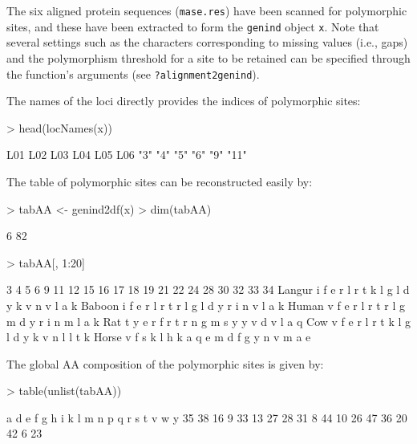 \documentclass{article}
\begin{document}
The six aligned protein sequences (\texttt{mase.res}) have been scanned for polymorphic sites, and
these have been extracted to form the \texttt{genind} object \texttt{x}.
Note that several settings such as the characters corresponding to missing values (i.e., gaps) and
the polymorphism threshold for a site to be retained can be specified through the function's
arguments (see \texttt{?alignment2genind}).

The names of the loci directly provides the indices of polymorphic sites:
\begin{Schunk}
\begin{Sinput}
> head(locNames(x))
\end{Sinput}
\begin{Soutput}
 L01  L02  L03  L04  L05  L06 
 "3"  "4"  "5"  "6"  "9" "11" 
\end{Soutput}
\end{Schunk}
The table of polymorphic sites can be reconstructed easily by:
\begin{Schunk}
\begin{Sinput}
> tabAA <- genind2df(x)
> dim(tabAA)
\end{Sinput}
\begin{Soutput}
[1]  6 82
\end{Soutput}
\begin{Sinput}
> tabAA[, 1:20]
\end{Sinput}
\begin{Soutput}
       3 4 5 6 9 11 12 15 16 17 18 19 21 22 24 28 30 32 33 34
Langur i f e r l  r  t  k  l  g  l  d  y  k  v  n  v  l  a  k
Baboon i f e r l  r  t  r  l  g  l  d  y  r  i  n  v  l  a  k
Human  v f e r l  r  t  r  l  g  m  d  y  r  i  n  m  l  a  k
Rat    t y e r f  r  t  r  n  g  m  s  y  y  v  d  v  l  a  q
Cow    v f e r l  r  t  k  l  g  l  d  y  k  v  n  l  l  t  k
Horse  v f s k l  h  k  a  q  e  m  d  f  g  y  n  v  m  a  e
\end{Soutput}
\end{Schunk}
The global AA composition of the polymorphic sites is given by:
\begin{Schunk}
\begin{Sinput}
> table(unlist(tabAA))
\end{Sinput}
\begin{Soutput}
 a  d  e  f  g  h  i  k  l  m  n  p  q  r  s  t  v  w  y 
35 38 16  9 33 13 27 28 31  8 44 10 26 47 36 20 42  6 23 
\end{Soutput}
\end{Schunk}
\end{document}
